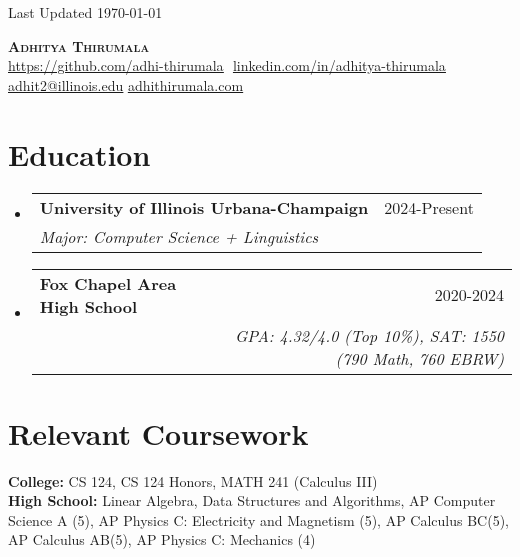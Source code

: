 \documentclass{article}
\makeatletter
\newcommand{\resumeSubheading}[4]{
  \vspace{-2pt}\item
    \begin{tabular*}{0.97\textwidth}[t]{l@{\extracolsep{\fill}}r}
      \textbf{#1} & #2 \\
      \textit{\small#3} & \textit{\small #4} \\
    \end{tabular*}\vspace{-7pt}
}
\newcommand{\resumeSubHeadingListStart}{\begin{itemize}[leftmargin=0.15in, label={}]}
\newcommand{\resumeSubHeadingListEnd}{\end{itemize}}
\makeatother
\begin{document}
\begin{flushright}
	\vspace{-4pt}
	\color{gray}
	\item
	Last Updated \today
\end{flushright}

\vspace{-7pt}

\begin{center}
	\textbf{{\Huge\scshape Adhitya Thirumala}} \\ \vspace{8pt}
	\small
	\href{https://github.com/adhi-thirumala}{\underline{https://github.com/adhi-thirumala}} $  $
	\href{www.linkedin.com/in/adhitya-thirumala}
	{\underline{linkedin.com/in/adhitya-thirumala}} $  $
	\href{mailto:adhit2@illinois.edu}
	{\underline{adhit2@illinois.edu}}
	\href{https://www.adhithirumala.com}
	{\underline{adhithirumala.com}} $  $


\end{center}

\section{Education}
\resumeSubHeadingListStart

\resumeSubheading{University of Illinois Urbana-Champaign} {2024-Present} {Major: Computer Science + Linguistics}{}
\resumeSubheading
{Fox Chapel Area High School}{2020-2024}
{}{GPA: 4.32/4.0 (Top 10\%), SAT: 1550 (790 Math, 760 EBRW)}
\resumeSubHeadingListEnd
\vspace{-15pt}
\section{Relevant Coursework}
\begin{itemize}[leftmargin=0.15in, label={}]
	\small{\item{
		            \textbf{College:}{ CS 124, CS 124 Honors, MATH 241 (Calculus III)}\\
		            \textbf{High School:}{ Linear Algebra, Data Structures and Algorithms, AP Computer Science A (5), AP Physics C: Electricity and Magnetism (5), AP Calculus BC(5), AP Calculus AB(5), AP Physics C: Mechanics (4)} \\

		      }}
\end{itemize}
\end{document}
